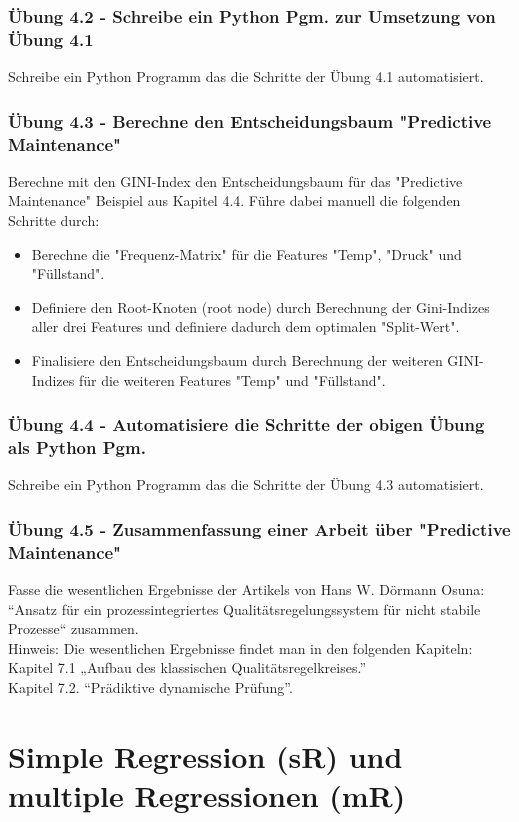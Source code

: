 \documentclass[12pt]{article}
\begin{document}
\subsubsection{Übung 4.2 - Schreibe ein Python Pgm. zur Umsetzung von Übung 4.1}
Schreibe ein Python Programm das die Schritte der Übung 4.1 automatisiert.\\
%
\subsubsection{Übung 4.3 - Berechne den Entscheidungsbaum "Predictive Maintenance"}
Berechne mit den GINI-Index den Entscheidungsbaum für das "Predictive Maintenance" Beispiel aus Kapitel 4.4. Führe dabei manuell die folgenden Schritte durch:\\
\begin{itemize}
    \item Berechne die "Frequenz-Matrix" für die Features "Temp", "Druck" und "Füllstand".  
    \item Definiere den Root-Knoten (root node) durch Berechnung der Gini-Indizes aller drei Features und definiere dadurch dem optimalen "Split-Wert".
    \item Finalisiere den Entscheidungsbaum durch Berechnung der weiteren GINI-Indizes für die weiteren Features "Temp" und "Füllstand".
\end{itemize}
%
\subsubsection{Übung 4.4 - Automatisiere die Schritte der obigen Übung als Python Pgm.}
Schreibe ein Python Programm das die Schritte der Übung 4.3 automatisiert.\\\subsubsection{Übung 4.5 - Zusammenfassung einer Arbeit über "Predictive Maintenance"}
Fasse die wesentlichen Ergebnisse der Artikels von Hans W. Dörmann Osuna: “Ansatz für ein prozessintegriertes Qualitätsregelungssystem für nicht stabile Prozesse“ zusammen.\\ 
Hinweis: Die wesentlichen Ergebnisse findet man in den folgenden Kapiteln:\\
Kapitel 7.1 „Aufbau des klassischen Qualitätsregelkreises.”\\
Kapitel 7.2. “Prädiktive dynamische Prüfung”.
%
\newpage

\section{Simple Regression (sR) und multiple Regressionen (mR) \\}
\end{document}
